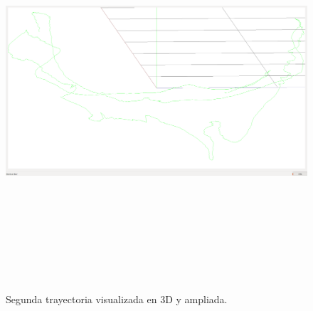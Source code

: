 \begin{figure}[H]
\begin{center}
\label{fig:secondTrayectory}\includegraphics[height=14.0cm,width=18.0cm]{img/cap6/segundaTrayectoria.png}
\hspace{0.5cm}

\end{center}
\caption{ Segunda trayectoria visualizada en 3D y ampliada.}
\end{figure}

